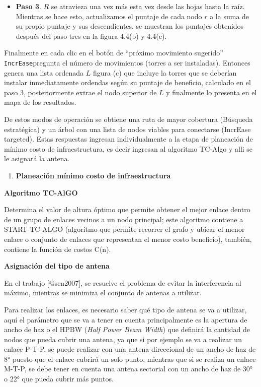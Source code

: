 \documentclass[]{article}
\providecommand{\tightlist}{%
  \setlength{\itemsep}{0pt}\setlength{\parskip}{0pt}}
\begin{document}
\begin{itemize}
\tightlist
\item
  \textbf{Paso 3}. \(R\) se atravieza una vez más esta vez desde las
  hojas hasta la raíz. Mientras se hace esto, actualizamos el puntaje de
  cada nodo \(r\) a la suma de su propio puntaje y sus descendientes. se
  muestran los puntajes obtenidos después del paso tres en la figura
  4.4(b) y 4.4(c).
\end{itemize}

Finalmente en cada clic en el botón de ``próximo movimiento sugerido''
\texttt{IncrEase}pregunta el número de movimientos (torres a ser
instaladas). Entonces genera una lista ordenada \(L\) figura (c) que
incluye la torres que se deberían instalar inmediatamente ordendas según
su puntaje de beneficio, calculado en el paso 3, posteriormente extrae
el nodo superior de \(L\) y finalmente lo presenta en el mapa de los
resultados.

De estos modos de operación se obtiene una ruta de mayor cobertura
(Búsqueda estratégica) y un árbol con una lista de nodos viables para
conectarse (IncrEase targeted). Estas respuestas ingresan
individualmente a la etapa de planeación de mínimo costo de
infraestructura, es decir ingresan al algoritmo TC-Algo y alli se le
asignará la antena.

\begin{enumerate}
\def\labelenumi{\arabic{enumi}.}
\setcounter{enumi}{2}
\tightlist
\item
  \textbf{Planeación mínimo costo de infraestructura}
\end{enumerate}

\textbf{Algoritmo TC-AlGO}

Determina el valor de altura óptimo que permite obtener el mejor enlace
dentro de un grupo de enlaces vecinos a un nodo principal; este
algoritmo contiene a START-TC-ALGO (algoritmo que permite recorrer el
grafo y ubicar el menor enlace o conjunto de enlaces que representan el
menor costo beneficio), también, contiene la función de costos C(n).

\textbf{Asignación del tipo de antena}

En el trabajo {[}@sen2007{]}, se resuelve el problema de evitar la
interferencia al máximo, mientras se minimiza el conjunto de antenas a
utilizar.

Para realizar los enlaces, es necesario saber qué tipo de antena se va a
utilizar, aquí el parámetro que se va a tener en cuenta principalmente
es la apertura de ancho de haz o el HPBW (\emph{Half Power Beam Width})
que definirá la cantidad de nodos que pueda cubrir una antena, ya que si
por ejemplo se va a realizar un enlace P-T-P, se puede realizar con una
antena direccional de un ancho de haz de 8° puesto que el enlace cubrirá
un solo punto, mientras que si se realiza un enlace M-T-P, se debe tener
en cuenta una antena sectorial con un ancho de haz de 30° o 22° que
pueda cubrir más puntos.
\end{document}
